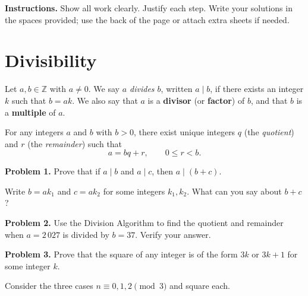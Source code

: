 \maketitle
\thispagestyle{fancy}

\noindent
\textbf{Instructions.}
Show all work clearly. Justify each step. Write your solutions in the
spaces provided; use the back of the page or attach extra sheets if needed.

\section{Divisibility}

\begin{defbox}
Let $a, b \in \mathbb{Z}$ with $a \neq 0$.
We say \emph{$a$ divides $b$}, written $a \mid b$, if there exists an
integer $k$ such that $b = ak$.
We also say that $a$ is a \textbf{divisor} (or \textbf{factor}) of $b$,
and that $b$ is a \textbf{multiple} of $a$.
\end{defbox}

\begin{defbox}
For any integers $a$ and $b$ with $b > 0$, there exist unique integers
$q$ (the \emph{quotient}) and $r$ (the \emph{remainder}) such that
\[
  a = bq + r, \qquad 0 \le r < b.
\]
\end{defbox}

\bigskip

\textbf{Problem 1.}\;
Prove that if $a \mid b$ and $a \mid c$, then $a \mid (b + c)$.

\begin{hintbox}
Write $b = ak_1$ and $c = ak_2$ for some integers $k_1, k_2$.  What can you
say about $b + c$?
\end{hintbox}

\answerspace[2.2in]

\textbf{Problem 2.}\;
Use the Division Algorithm to find the quotient and remainder when
$a = 2\,027$ is divided by $b = 37$.  Verify your answer.

\answerspace[1.8in]

\textbf{Problem 3.}\;
Prove that the square of any integer is of the form $3k$ or $3k+1$ for some
integer $k$.

\begin{hintbox}
Consider the three cases $n \equiv 0, 1, 2 \pmod{3}$ and square each.
\end{hintbox}

